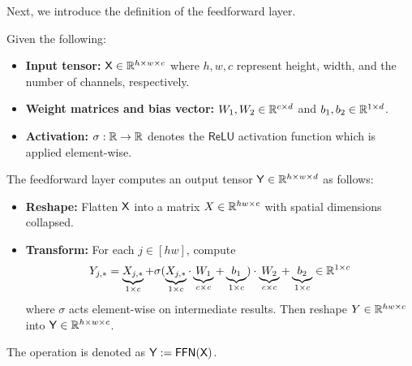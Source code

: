 Next, we introduce the definition of the feedforward layer.
\begin{definition}\label{def:ffn}
Given the following:
\begin{itemize}
    \item {\bf Input tensor:} $\mathsf{X} \in \mathbb{R}^{h \times w \times c}$ where $h,w,c$ represent height, width, and the number of channels, respectively.
    \item {\bf Weight matrices and bias vector:} $W_1, W_2 \in \mathbb{R}^{c \times d}$ and $b_1, b_2 \in \mathbb{R}^{1 \times d}$.
    \item {\bf Activation:} $\sigma:\mathbb{R} \to \mathbb{R}$ denotes the $\mathsf{ReLU}$ activation function which is applied element-wise.
\end{itemize}
The feedforward layer computes an output tensor $\mathsf{Y} \in \mathbb{R}^{h \times w \times d}$ as follows:
\begin{itemize}
    \item {\bf Reshape:} Flatten $\mathsf{X}$ into a matrix $X \in \mathbb{R}^{hw \times c}$ with spatial dimensions collapsed.
    \item {\bf Transform:} For each $j \in [hw]$, compute 
    \begin{align*}
        Y_{j,*}=  \underbrace{X_{j,*}}_{1 \times c} +  \sigma (\underbrace{X_{j,*}}_{1\times c} \cdot \underbrace{W_1}_{c \times c} + \underbrace{b_1}_{1\times c}) \cdot \underbrace{W_2}_{c \times c} + \underbrace{b_2}_{1 \times c} \in \mathbb{R}^{1 \times c}
    \end{align*}
    where $\sigma$ acts element-wise on intermediate results. Then reshape $Y \in \mathbb{R}^{hw \times c}$ into $\mathsf{Y} \in \mathbb{R}^{h \times w \times c}$.
\end{itemize}
The operation is denoted as $\mathsf{Y} := \mathsf{FFN}(\mathsf{X})$.

\end{definition}

